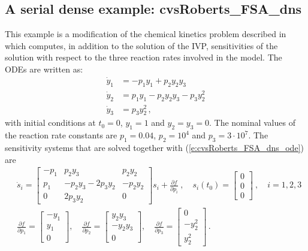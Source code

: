 
\newpage
\subsection{A serial dense example: cvsRoberts\_FSA\_dns}
\label{ss:cvsRoberts_FSA_dns}

This example is a modification of the chemical kinetics problem described 
in~\cite{cvode_ex} which computes, in addition to the solution of the
IVP, sensitivities of the solution with respect to the three reaction rates 
involved in the model. The ODEs are written as:
\begin{equation}\label{e:cvsRoberts_FSA_dns_ode}
  \begin{split}
    {\dot y}_1 &= -p_1 y_1 + p_2 y_2 y_3   \\
    {\dot y}_2 &=  p_1 y_1 - p_2 y_2 y_3 - p_3 y_2^2 \\
    {\dot y}_3 &=  p_3 y_2^2 \, ,
  \end{split}
\end{equation}
with initial conditions at $t_0 = 0$, $y_1 = 1$ and $y_2 = y_3 = 0$. 
The nominal values of the reaction rate constants are 
$p_1 = 0.04$, $p_2 = 10^4$ and $p_3 = 3\cdot 10^7$.
The sensitivity systems that are solved together with (\ref{e:cvsRoberts_FSA_dns_ode}) are
\begin{equation}\label{e:cvsRoberts_FSA_dns_sens}
  \begin{split}
    & {\dot s}_i = 
    \begin{bmatrix}
      - p_1 &   p_2 y_3             &   p_2 y_2 \\
        p_1 & - p_2 y_3 - 2 p_3 y_2 & - p_2 y_2 \\
        0   &             2 p_3 y_2 &  0              
    \end{bmatrix}
    s_i + \frac{\partial f}{\partial p_i} ~,
    \quad s_i(t_0) = \begin{bmatrix} 0 \\ 0 \\ 0 \end{bmatrix}  ~,
    \quad i = 1,2,3 \\
    & \frac{\partial f}{\partial p_1} = \begin{bmatrix} -y_1 \\ y_1 \\ 0 \end{bmatrix}, \quad
    \frac{\partial f}{\partial p_2} = \begin{bmatrix} y_2 y_3 \\ -y_2 y_3 \\ 0 \end{bmatrix}, \quad
    \frac{\partial f}{\partial p_3} = \begin{bmatrix} 0 \\ - y_2^2 \\ y_2^2 \end{bmatrix} \, .
  \end{split}
\end{equation}

